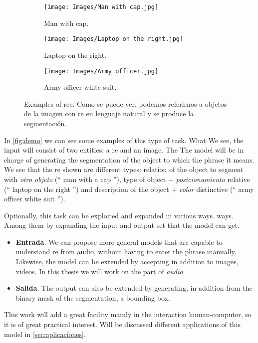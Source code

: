 \begin{figure}[ht]
  \centering
  \begin{subfigure}[t]{.32\textwidth}
    \centering
    \caption{Man with cap.}
    \texttt{[image: Images/Man with cap.jpg]}
  \end{subfigure}\hfill
  \begin{subfigure}[t]{.32\textwidth}
    \centering
    \caption{Laptop on the right.}
    \texttt{[image: Images/Laptop on the right.jpg]}
  \end{subfigure}\hfill
  \begin{subfigure}[t]{.32\textwidth}
    \centering
    \caption{Army officer white suit.}
    \texttt{[image: Images/Army officer.jpg]}
  \end{subfigure}
  \caption[Examples of \acl*{rec}]{Examples of \acl{rec}. Como se puede ver,
    podemos referirnos a objetos de la imagen con \gls{re} en lenguaje natural
    y se produce la segmentación.}
  \label{fig:demo}
\end{figure}

In \vref{fig:demo} we can see some examples of this type of task. What
We see, the input will consist of two entities: a \gls{re} and an image. The
The model will be in charge of generating the segmentation of the object to which the phrase
it means. We see that the \gls{re} shown are different types: relation of the
object to segment with \emph{otro objeto} (`` man with a cap ''), type of object
+ \emph{posicionamiento} relative (`` laptop on the right '') and description of the
object + \emph{color} distinctive (`` army officer white suit '').

Optionally, this task can be exploited and expanded in various ways.
ways. Among them by expanding the input and output set that the
model can get.
\begin{itemize}
  \item \textbf{Entrada}. We can propose more general models that are capable
  to understand \gls{re} from audio, without having to enter the
  phrase manually. Likewise, the model can be extended by accepting
  in addition to images, videos. In this thesis we will work on the part of
  \emph{audio}.
  \item \textbf{Salida}. The output can also be extended by generating, in addition
  from the binary mask of the segmentation, a bounding box.
\end{itemize}

This work will add a great facility mainly in the interaction
human-computer, so it is of great practical interest. Will be discussed
different applications of this model in \vref{sec:aplicaciones}.

